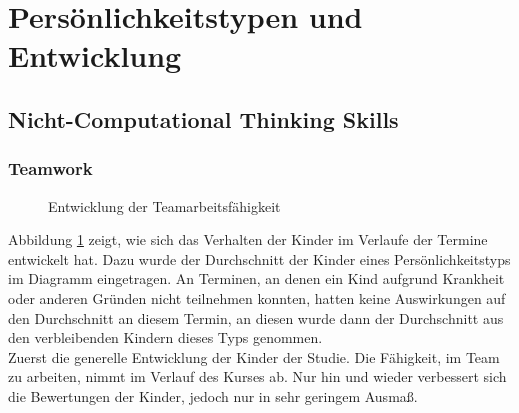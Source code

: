 \section{Persönlichkeitstypen und Entwicklung} \label{sec:personalityAndDevelopment}
\subsection{Nicht-Computational Thinking Skills}
\subsubsection{Teamwork}
\begin{figure}[H]
	\centering
	\caption{Entwicklung der Teamarbeitsfähigkeit}
	\label{img:teamDevelopment}
\end{figure}
Abbildung \ref{img:teamDevelopment} zeigt, wie sich das Verhalten der Kinder im Verlaufe der Termine entwickelt hat. Dazu wurde der Durchschnitt der Kinder eines Persönlichkeitstyps im Diagramm eingetragen. An Terminen, an denen ein Kind aufgrund Krankheit oder anderen Gründen nicht teilnehmen konnten, hatten keine Auswirkungen auf den Durchschnitt an diesem Termin, an diesen wurde dann der Durchschnitt aus den verbleibenden Kindern dieses Typs genommen.\\
Zuerst die generelle Entwicklung der Kinder der Studie. Die Fähigkeit, im Team zu arbeiten, nimmt im Verlauf des Kurses ab. Nur hin und wieder verbessert sich die Bewertungen der Kinder, jedoch nur in sehr geringem Ausmaß.\\
